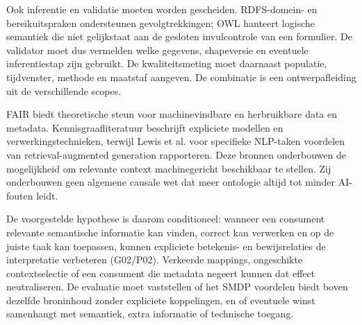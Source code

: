 Ook inferentie en validatie moeten worden gescheiden. RDFS-domein- en bereikuitspraken ondersteunen gevolgtrekkingen; OWL hanteert logische semantiek die niet gelijkstaat aan de gesloten invulcontrole van een formulier. \citep{S29,S30} De validator moet dus vermelden welke gegevens, shapeversie en eventuele inferentiestap zijn gebruikt. De kwaliteitsmeting moet daarnaast populatie, tijdvenster, methode en maatstaf aangeven. De combinatie is een ontwerpafleiding uit de verschillende scopes.

FAIR biedt theoretische steun voor machinevindbare en herbruikbare data en metadata. Kennisgraafliteratuur beschrijft expliciete modellen en verwerkingstechnieken, terwijl Lewis et al. voor specifieke NLP-taken voordelen van retrieval-augmented generation rapporteren. \citep{L11,L13,L16} Deze bronnen onderbouwen de mogelijkheid om relevante context machinegericht beschikbaar te stellen. Zij onderbouwen geen algemene causale wet dat meer ontologie altijd tot minder AI-fouten leidt.

De voorgestelde hypothese is daarom conditioneel: wanneer een consument relevante semantische informatie kan vinden, correct kan verwerken en op de juiste taak kan toepassen, kunnen expliciete betekenis- en bewijsrelaties de interpretatie verbeteren (G02/P02). Verkeerde mappings, ongeschikte contextselectie of een consument die metadata negeert kunnen dat effect neutraliseren. De evaluatie moet vaststellen of het SMDP voordelen biedt boven dezelfde broninhoud zonder expliciete koppelingen, en of eventuele winst samenhangt met semantiek, extra informatie of technische toegang.
